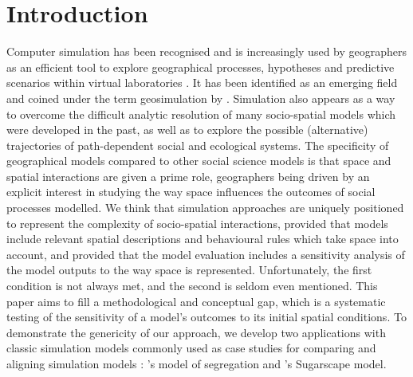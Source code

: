 \documentclass{JASSS}
\begin{document}
%




\section{Introduction}

Computer simulation has been recognised and is increasingly used by geographers as an efficient tool to explore geographical processes, hypotheses and predictive scenarios within virtual laboratories \citep{batty1971modelling, batty2007model, carley1999generating, Quesneletal2009}. It has been identified as an emerging field and coined under the term geosimulation by \cite{benenson2004geosimulation}. Simulation also appears as a way to overcome the difficult analytic resolution of many socio-spatial models which were developed in the past, as well as to explore the possible (alternative) trajectories of path-dependent social and ecological systems. The specificity of geographical models compared to other social science models is that space and spatial interactions are given a prime role, geographers being driven by an explicit interest in studying the way space influences the outcomes of social processes modelled. We think that simulation approaches are uniquely positioned to represent the complexity of socio-spatial interactions, provided that models include relevant spatial descriptions and behavioural rules which take space into account, and provided that the model evaluation includes a sensitivity analysis of the model outputs to the way space is represented. Unfortunately, the first condition is not always met, and the second is seldom even mentioned. This paper aims to fill a methodological and conceptual gap, which is a systematic testing of the sensitivity of a model's outcomes to its initial spatial conditions. To demonstrate the genericity of our approach, we develop two applications with classic simulation models commonly used as case studies for comparing and aligning simulation models \citep{Axtelletal1996, wilensky2007making}: \citet{schelling1971dynamic}'s model of segregation and \citet{EpsteinAxtell1996}'s Sugarscape model.\\
\end{document}

